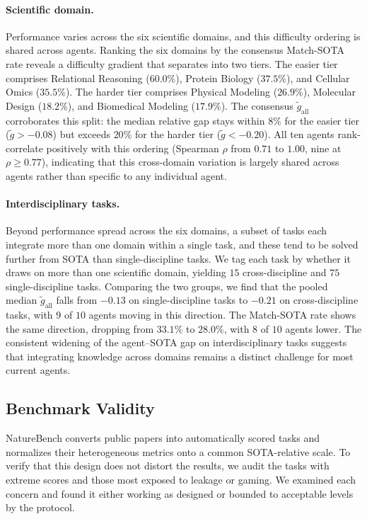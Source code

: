 \documentclass{llmxive}
\begin{document}
\paragraph{Scientific domain.} Performance varies across the six scientific domains, and this difficulty ordering is shared across agents.
Ranking the six domains by the consensus Match-SOTA rate reveals a difficulty gradient that separates into two tiers. The easier tier comprises Relational Reasoning ($60.0\%$), Protein Biology ($37.5\%$), and Cellular Omics ($35.5\%$). The harder tier comprises Physical Modeling ($26.9\%$), Molecular Design ($18.2\%$), and Biomedical Modeling ($17.9\%$). The consensus $\tilde{g}_{\text{all}}$ corroborates this split: the median relative gap stays within $8\%$ for the easier tier ($\tilde{g} > -0.08$) but exceeds $20\%$ for the harder tier ($\tilde{g} < -0.20$). All ten agents rank-correlate positively with this ordering (Spearman $\rho$ from $0.71$ to $1.00$, nine at $\rho \ge 0.77$), indicating that this cross-domain variation is largely shared across agents rather than specific to any individual agent.

\paragraph{Interdisciplinary tasks.}
Beyond performance spread across the six domains, a subset of tasks each integrate more than one domain within a single task, and these tend to be solved further from SOTA than single-discipline tasks. We tag each task by whether it draws on more than one scientific domain, yielding $15$ cross-discipline and $75$ single-discipline tasks. Comparing the two groups, we find that the pooled median $\tilde{g}_{\text{all}}$ falls from $-0.13$ on single-discipline tasks to $-0.21$ on cross-discipline tasks, with $9$ of $10$ agents moving in this direction. The Match-SOTA rate shows the same direction, dropping from $33.1\%$ to $28.0\%$, with $8$ of $10$ agents lower. The consistent widening of the agent--SOTA gap on interdisciplinary tasks suggests that integrating knowledge across domains remains a distinct challenge for most current agents.


\subsection{Benchmark Validity}
\label{sec:exp:validity}

NatureBench converts public papers into automatically scored tasks and normalizes their heterogeneous metrics onto a common SOTA-relative scale. To verify that this design does not distort the results, we audit the tasks with extreme scores and those most exposed to leakage or gaming. We examined each concern and found it either working as designed or bounded to acceptable levels by the protocol.
\end{document}
